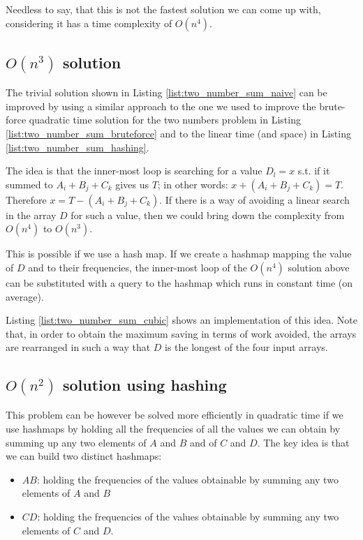 Needless to say, that this is not the fastest solution we can come up with, considering it has a time complexity of $O(n^4)$.

\subsection{$O(n^3)$ solution}
The trivial solution shown in Listing \ref{list:two_number_sum_naive} can be improved by using a similar approach to the one we used to improve the brute-force 
quadratic time solution for the two numbers problem in Listing \ref{list:two_number_sum_bruteforce} and to the linear time (and space) in Listing \ref{list:two_number_sum_hashing}.

The idea is that the inner-most loop is searching for a value $D_l = x$  s.t. if it summed to $A_i+B_j+C_k$ gives us $T$; in other words: $x+(A_i+B_j+C_k)=T$.
Therefore $x = T-(A_i+B_j+C_k)$. If there is a way of avoiding a linear search in the array $D$ for such a value, then we could bring down the complexity from $O(n^4)$ to $O(n^3)$.

This is possible if we use a hash map. If we create a hashmap mapping the value of $D$ and to their frequencies, the inner-most loop of the $O(n^4)$ solution above can be substituted with a query to the hashmap which runs in constant time (on average). 

Listing \ref{list:two_number_sum_cubic} shows an implementation of this idea. 
Note that, in order to obtain the maximum saving in terms of work avoided, the arrays are rearranged in such a way that $D$ is the longest of the four input arrays. 




\subsection{$O(n^2)$ solution using hashing}

This problem can be however be solved  more efficiently in quadratic time if we use hashmaps by holding all  
the frequencies of all the values we can obtain by summing up any two elements of $A$ and $B$ and of $C$ and $D$.
The key idea is that we can build two distinct hashmaps:
\begin{itemize}
	\item $AB$: holding the frequencies of the values obtainable by summing any two elements of $A$ and $B$
	\item $CD$: holding the frequencies of the values obtainable by summing any two elements of $C$ and $D$.
\end{itemize}

